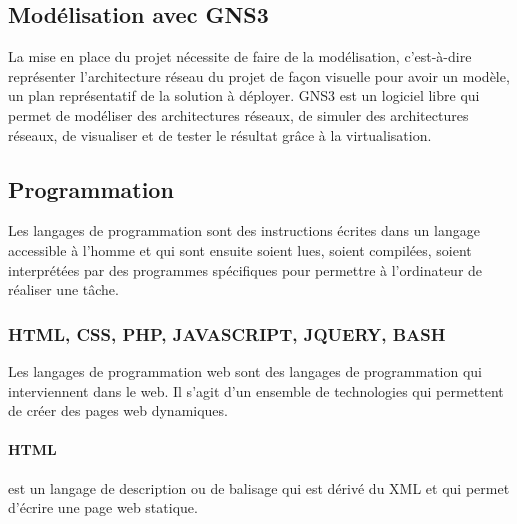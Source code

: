 \documentclass[a4paper,12pt,french]{report} %
\begin{document}
\subsection{Modélisation avec GNS3}
La mise en place du projet nécessite de faire de la modélisation, c'est-à-dire représenter l'architecture réseau du projet de façon visuelle pour avoir un modèle, un plan représentatif de la solution à déployer. GNS3 est un logiciel libre qui permet de modéliser des architectures réseaux, de simuler des architectures réseaux, de visualiser et de tester le résultat grâce à la virtualisation.
\subsection{Programmation}
Les langages de programmation sont des instructions écrites dans un langage accessible à l'homme et qui sont ensuite soient lues, soient compilées, soient interprétées par des programmes spécifiques pour permettre à l'ordinateur de réaliser une tâche.
\subsubsection{HTML, CSS, PHP, JAVASCRIPT, JQUERY, BASH}
Les langages de programmation  web sont des langages de programmation qui interviennent dans le web. Il s'agit d'un ensemble de technologies qui permettent de créer des pages web dynamiques.
\paragraph{HTML} est un langage de description ou de balisage qui est dérivé du XML et qui permet d'écrire une page web statique. 
\end{document}
